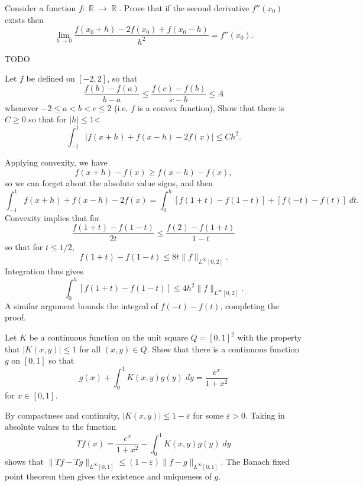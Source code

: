 \documentclass[answers]{exam}
\DeclareMathOperator{\RR}{\mathbb{R}}
\begin{document}
\begin{questions}
\question Consider a function $f: \RR \to \RR$. Prove that if the second derivative $f''(x_0)$ exists then
%
\[ \lim_{h \to 0} \frac{f(x_0 + h) - 2 f(x_0) + f(x_0 - h)}{h^2} = f''(x_0). \]
\begin{solution}
	TODO
\end{solution}

\question Let $f$ be defined on $[-2,2]$, so that
%
\[ \frac{f(b) - f(a)}{b - a} \leq \frac{f(c) - f(b)}{c - b} \leq A \]
%
whenever $-2 \leq a < b < c \leq 2$ (i.e. $f$ is a convex function), Show that there is $C \geq 0$ so that for $|h| \leq 1$<
%
\[ \int_{-1}^1 |f(x+h) + f(x - h) - 2f(x)| \leq C h^2. \]
\begin{solution}
	Applying convexity, we have
	\[ f(x + h) - f(x) \geq f(x - h) - f(x), \]
	so we can forget about the absolute value signs, and then
	\[ \int_{-1}^1 f(x + h) + f(x - h) - 2f(x) = \int_0^h [f(1+t) - f(1 - t)] + [ f(-t) - f(t) ]\; dt. \]
	Convexity implies that for
	\[ \frac{f(1 + t) - f(1 - t)}{2t} \leq \frac{f(2) - f(1 + t)}{1 - t} \]
	so that for $t \leq 1/2$,
	\[ f(1 + t) - f(1 - t) \leq 8t \| f \|_{L^\infty[0,2]}. \]
	Integration thus gives
	\[ \int_0^h [ f(1+t) - f(1 - t) ] \leq 4h^2 \| f \|_{L^\infty[0,2]}. \]	
	A similar argument bounds the integral of $f(-t) - f(t)$, completing the proof.
\end{solution}

\question Let $K$ be a continuous function on the unit square $Q = [0,1]^2$ with the property that $|K(x,y)| \leq 1$ for all $(x,y) \in Q$. Show that there is a continuous function $g$ on $[0,1]$ so that
%
\[ g(x) + \int_0^1 K(x,y) g(y)\; dy = \frac{e^x}{1 + x^2} \]
%
for $x \in [0,1]$.
\begin{solution}
	By compactness and continuity, $|K(x,y)| \leq 1 - \varepsilon$ for some $\varepsilon > 0$. Taking in absolute values to the function
	\[ Tf(x) = \frac{e^x}{1 + x^2} - \int_0^1 K(x,y) g(y)\; dy \]
	shows that $\| Tf - Tg \|_{L^\infty[0,1]} \leq (1 - \varepsilon) \| f - g \|_{L^\infty[0,1]}$. The Banach fixed point theorem then gives the existence and uniqueness of $g$.
\end{solution}


\end{questions}
\end{document}
